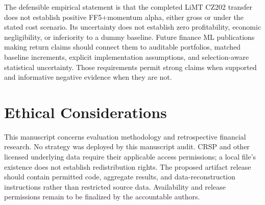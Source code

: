 \documentclass{article}
\begin{document}
The defensible empirical statement is that the completed LiMT CZ202 transfer does not establish positive FF5+momentum alpha, either gross or under the stated cost scenario. Its uncertainty does not establish zero profitability, economic negligibility, or inferiority to a dummy baseline. Future finance ML publications making return claims should connect them to auditable portfolios, matched baseline increments, explicit implementation assumptions, and selection-aware statistical uncertainty. Those requirements permit strong claims when supported and informative negative evidence when they are not.

\section*{Ethical Considerations}
This manuscript concerns evaluation methodology and retrospective financial research. No strategy was deployed by this manuscript audit. CRSP and other licensed underlying data require their applicable access permissions; a local file's existence does not establish redistribution rights. The proposed artifact release should contain permitted code, aggregate results, and data-reconstruction instructions rather than restricted source data. Availability and release permissions remain to be finalized by the accountable authors.

\clearpage


\end{document}

